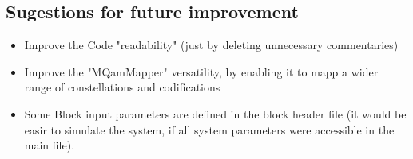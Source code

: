 \subsection*{Sugestions for future improvement}
\begin{itemize}
\item Improve the Code "readability" (just by deleting unnecessary commentaries)
\item Improve the "MQamMapper" versatility, by enabling it to mapp a wider range of constellations and codifications
\item Some Block input parameters are defined in the block header file (it would be easir to simulate the system, if all system parameters were accessible in the main file).
\end{itemize}
